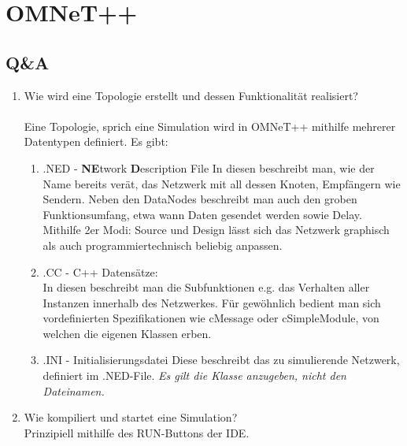 \documentclass[11pt]{article}
\begin{document}
    \lstset{language=C++}
    \graphicspath{{PictureDoc/}}


    \section{OMNeT++}
    \subsection{Q\&A}

    \begin{enumerate}[\thesubsection .1]
        \item Wie wird eine Topologie erstellt und dessen Funktionalität realisiert?\\\\
        Eine Topologie, sprich eine Simulation wird in OMNeT++ mithilfe mehrerer Datentypen definiert. Es gibt:
        \begin{enumerate}[$\circ$]
            \item .NED - \textbf{NE}twork \textbf{D}escription File
            In diesen beschreibt man, wie der Name bereits verät, das Netzwerk mit all dessen Knoten, Empfängern wie Sendern.
            Neben den DataNodes beschreibt man auch den groben Funktionsumfang, etwa wann Daten gesendet werden sowie Delay.
            Mithilfe 2er Modi: Source und Design lässt sich das Netzwerk graphisch als auch programmiertechnisch beliebig anpassen.\\

            \item .CC - C++ Datensätze:\\
            In diesen beschreibt man die Subfunktionen e.g. das Verhalten aller Instanzen innerhalb des Netzwerkes.
            Für gewöhnlich bedient man sich vordefinierten Spezifikationen wie cMessage oder cSimpleModule, von welchen
            die eigenen Klassen erben.\\
            \item .INI - Initialisierungsdatei
            Diese beschreibt das zu simulierende Netzwerk, definiert im .NED-File.
            \emph{Es gilt die Klasse anzugeben, nicht den Dateinamen.\\}
        \end{enumerate}

        \item Wie kompiliert und startet eine Simulation?\\
        Prinzipiell mithilfe des RUN-Buttons der IDE.


\end{enumerate}
\end{document}
